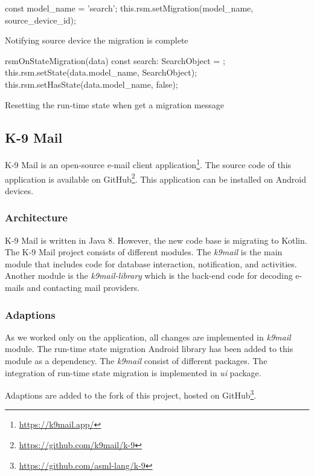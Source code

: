 \FloatBarrier
\begin{code}
\begin{js2}
const model_name = 'search';
this.rsm.setMigration(model_name, source_device_id);
\end{js2}
\caption{Notifying source device the migration is complete}
\label{lis:js-mg-set}
\end{code}
\FloatBarrier

\FloatBarrier
\begin{code}
\begin{js2}
rsmOnStateMigration(data) {
    const search: SearchObject = {};
    this.rsm.setState(data.model_name, SearchObject);
    this.rsm.setHasState(data.model_name, false);
}
\end{js2}
\caption{Resetting the run-time state when get a migration message}
\label{lis:js-mg-get}
\end{code}
\FloatBarrier


\subsection{K-9 Mail}
K-9 Mail is an open-source e-mail client application\footnote{\url{https://k9mail.app/}}. The source code of this application is available on GitHub\footnote{\url{https://github.com/k9mail/k-9}}. This application can be installed on Android devices.

\subsubsection{Architecture}
K-9 Mail is written in Java 8. However, the new code base is migrating to Kotlin. The K-9 Mail project consists of different modules. The \textit{k9mail} is the main module that includes code for database interaction, notification, and activities. Another module is the \textit{k9mail-library} which is the back-end code for decoding e-mails and contacting mail providers. 

\subsubsection{Adaptions}
As we worked only on the application, all changes are implemented in \textit{k9mail} module. The run-time state migration Android library has been added to this module as a dependency. The \textit{k9mail} consist of different packages. The integration of run-time state migration is implemented in \textit{ui} package.

Adaptions are added to the fork of this project, hosted on GitHub\footnote{\url{https://github.com/asml-lang/k-9}}. 



